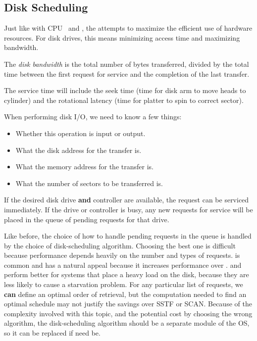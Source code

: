 \subsection{Disk Scheduling}\label{subsec:Disk_Scheduling}
Just like with CPU~ and , the  attempts to maximize the efficient use of hardware resources.
For disk drives, this means minimizing access time and maximizing bandwidth.

\begin{definition}\label{def:Disk_Bandwidth}
  The \emph{disk bandwidth} is the total number of bytes transferred, divided by the total time between the first request for service and the completion of the last transfer.

  The service time will include the seek time (time for disk arm to move heads to cylinder) and the rotational latency (time for platter to spin to correct sector).
\end{definition}

When performing disk I/O, we need to know a few things:
\begin{itemize}[noitemsep]
\item Whether this operation is input or output.
\item What the disk address for the transfer is.
\item What the memory address for the transfer is.
\item What the number of sectors to be transferred is.
\end{itemize}

If the desired disk drive \textbf{and} controller are available, the request can be serviced immediately.
If the drive or controller is busy, any new requests for service will be placed in the queue of pending requests for that drive.

Like before, the choice of how to handle pending requests in the queue is handled by the choice of disk-scheduling algorithm.
Choosing the best one is difficult because performance depends heavily on the number and types of requests.
 is common and has a natural appeal because it increases performance over .
 and  perform better for systems that place a heavy load on the disk, because they are less likely to cause a starvation problem.
For any particular list of requests, we \textbf{can} define an optimal order of retrieval, but the computation needed to find an optimal schedule may not justify the savings over SSTF or SCAN.\@
Because of the complexity involved with this topic, and the potential cost by choosing the wrong algorithm, the disk-scheduling algorithm should be a separate module of the OS, so it can be replaced if need be.

